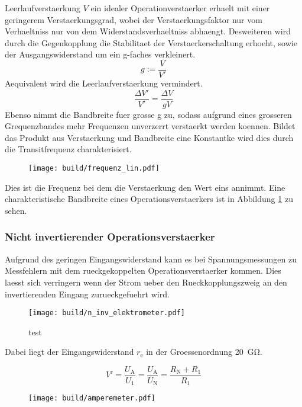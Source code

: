 Leerlaufverstaerkung $V$ ein idealer Operationverstaerker erhaelt mit einer
geringerem Verstaerkungsgrad, wobei der Verstaerkungsfaktor nur vom Verhaeltniss
nur von dem Widerstandsverhaeltniss abhaengt.
Desweiteren wird durch die Gegenkopplung die Stabilitaet der
Verstaerkerschaltung erhoeht, sowie der Ausgangswiderstand um ein g-faches
verkleinert.
\begin{equation}
		g := \frac{V}{V'}
\end{equation}
Aequivalent wird die Leerlaufverstaerkung vermindert.
\begin{equation}
		\frac{\Delta V'}{V'} = \frac{\Delta V}{g V}
\end{equation}
Ebenso nimmt die Bandbreite fuer grosse g zu, sodass aufgrund eines grosseren
Grequenzbandes mehr Frequenzen unverzerrt verstaerkt werden koennen.
Bildet das Produkt aus Verstaerkung und Bandbreite eine Konstantke wird dies
durch die Transitfrequenz charakterisiert.
\begin{figure}[h]
		\centering
		\texttt{[image: build/frequenz\_lin.pdf]}
		\caption{}
		\label{fig:freq}
\end{figure}
Dies ist die Frequenz bei dem die Verstaerkung den Wert eins annimmt.
Eine charakteristische Bandbreite eines Operationsverstaerkers ist in Abbildung
\ref{fig:freq} zu sehen.

\subsubsection{Nicht invertierender Operationsverstaerker}%
\label{ssub:nicht_invertierender_operationsverstaerker}

Aufgrund des geringen Eingangswiderstand kann es bei Spannungsmessungen zu
Messfehlern mit dem rueckgekoppelten Operationsverstaerker kommen.
Dies laesst sich verringern wenn der Strom ueber den Rueckkopplungszweig an den
invertierenden Eingang zurueckgefuehrt wird.
\begin{figure}[h]
		\centering
		\texttt{[image: build/n\_inv\_elektrometer.pdf]}
		\caption{test}
		\label{fig:test}
\end{figure}
Dabei liegt der Eingangswiderstand $r_\text{e}$ in der Groessenordnung
\SI{20}{\giga\ohm}.

\begin{equation}
		V' = \frac{U_\text{A}}{U_1} = \frac{U_\text{A}}{U_\text{N}} =
		\frac{R_\text{N} + R_1}{R_1}
\end{equation}

\begin{figure}[h]
		\centering
		\texttt{[image: build/amperemeter.pdf]}
		\caption{}
		\label{fig:}
\end{figure}
